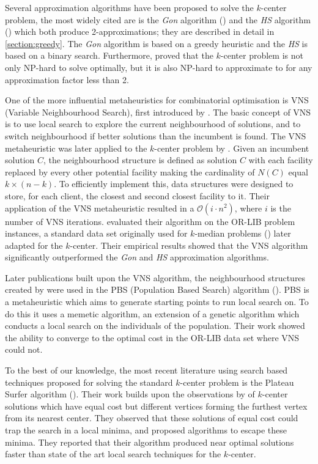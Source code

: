 Several approximation algorithms have been proposed to solve the $k$-center problem, the most widely cited are is the \emph{Gon} algorithm (\cite{gonzalez_clustering_1985}) and the \emph{HS} algorithm (\cite{hochbaum_best_1985}) which both produce 2-approximations; they are described in detail in \cref{section:greedy}. The \emph{Gon} algorithm is based on a greedy heuristic and the \emph{HS} is based on a binary search. Furthermore, \textcite{hochbaum_best_1985} proved that the $k$-center problem is not only NP-hard to solve optimally, but it is also NP-hard to approximate to for any approximation factor less than 2.

One of the more influential metaheuristics for combinatorial optimisation is VNS (Variable Neighbourhood Search), first introduced by \textcite{mladenovic_variable_1997}. The basic concept of VNS is to use local search to explore the current neighbourhood of solutions, and to switch neighbourhood if better solutions than the incumbent is found. The VNS metaheuristic was later applied to the $k$-center problem by \textcite{mladenovic_solving_2003}. Given an incumbent solution $C$, the neighbourhood structure is defined as solution $C$ with each facility replaced by every other potential facility making the cardinality of $N(C)$ equal $k\times (n-k)$. To efficiently implement this, data structures were designed to store, for each client, the closest and second closest facility to it. Their application of the VNS metaheuristic resulted in a $\mathcal{O}(i\cdot n^{2})$, where $i$ is the number of VNS iterations. \textcite{mladenovic_solving_2003} evaluated their algorithm on the OR-LIB problem instances, a standard data set originally used for $k$-median problems (\cite{beasley_note_1985}) later adapted for the $k$-center. Their empirical results showed that the VNS algorithm significantly outperformed the \emph{Gon} and \emph{HS} approximation algorithms.

Later publications built upon the VNS algorithm, the neighbourhood structures created by \textcite{mladenovic_solving_2003} were used in the PBS (Population Based Search) algorithm (\cite{pullan_memetic_2008}). PBS is a metaheuristic which aims to generate starting points to run local search on. To do this it uses a memetic algorithm, an extension of a genetic algorithm which conducts a local search on the individuals of the population. Their work showed the ability to converge to the optimal cost in the OR-LIB data set where VNS could not.

To the best of our knowledge, the most recent literature using search based techniques proposed for solving the standard $k$-center problem is the Plateau Surfer algorithm (\cite{battiti_new_2017}). Their work builds upon the observations by \textcite{mladenovic_solving_2003} of $k$-center solutions which have equal cost but different vertices forming the furthest vertex from its nearest center. They observed that these solutions of equal cost could trap the search in a local minima, and proposed algorithms to escape these minima. They reported that their algorithm produced near optimal solutions faster than state of the art local search techniques for the $k$-center.

